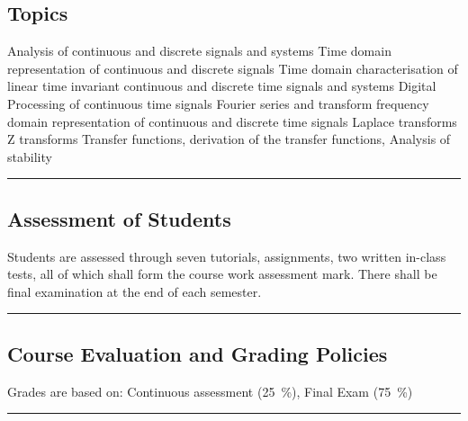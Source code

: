\subsection*{Topics}
\begin{outline}
    \1 Analysis of continuous and discrete signals and systems
    \1 Time domain representation of continuous and discrete signals
    \1 Time domain characterisation of linear time invariant continuous and discrete time signals and systems
    \1 Digital Processing of continuous time signals
    \1 Fourier series and transform frequency domain representation of continuous and discrete time signals
    \1 Laplace transforms
    \1 Z transforms
    \1 Transfer functions, derivation of the transfer functions, Analysis of stability
\end{outline}
\vspace{2ex} \hrule\vspace{2ex}

\subsection*{Assessment of Students}
\begin{outline}
    \1 Students are assessed through seven tutorials, assignments, two written in-class tests, all of which shall form the course work assessment mark.
    \1 There shall be final examination at the end of each semester.
\end{outline}
\vspace{2ex}\hrule\vspace{2ex}

\subsection*{Course Evaluation and Grading Policies}
Grades are based on:
Continuous assessment (\qty{25}{\percent}),
Final Exam (\qty{75}{\percent})
\vspace{2ex}\hrule\vspace{2ex}



